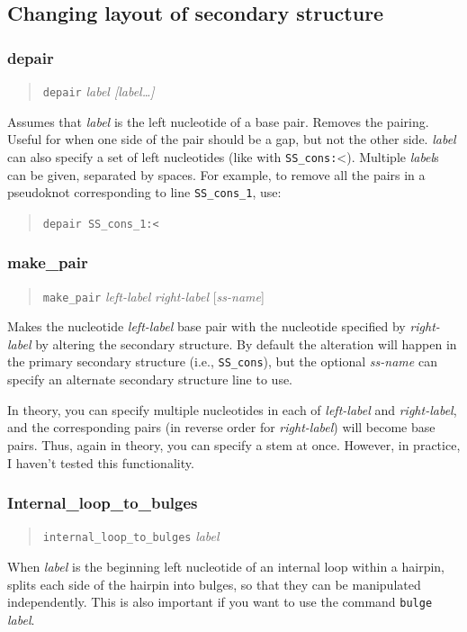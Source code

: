 \documentclass[letterpaper,12pt]{report}
\newcommand{\example}[1]{
\begin{quote}
{\raggedright
#1
}
\end{quote}
}
\newcommand{\examplett}[1]{
\example{{\tt #1}}
}
\begin{document}
\subsection{Changing layout of secondary structure}

\subsubsection{depair}
\example{{\tt depair} \textit{label [label{\dots}]}}

Assumes that \textit{label }is the left nucleotide of a base pair. 
Removes the pairing.  Useful for when one side of the pair should be a
gap, but not the other side.  \textit{label }can also specify a set of
left nucleotides (like with {\tt SS\_cons:}{\textless}). Multiple
\textit{label}s can be given, separated by spaces. For example, to
remove all the pairs in a pseudoknot corresponding to line {\tt SS\_cons\_1},
use:

\examplett{depair SS\_cons\_1:<}

\subsubsection{make\_pair}
\example{{\tt make\_pair} \textit{left-label} \textit{right-label} [\textit{ss-name}]}

Makes the nucleotide \textit{left-label} base pair with the nucleotide specified by \textit{right-label} by altering the secondary structure.  By default the alteration will happen in the primary secondary structure (i.e., {\tt SS\_cons}), but the optional \textit{ss-name} can specify an alternate secondary structure line to use.

In theory, you can specify multiple nucleotides in each of \textit{left-label} and \textit{right-label}, and the corresponding pairs (in reverse order for \textit{right-label}) will become base pairs.  Thus, again in theory, you can specify a stem at once.  However, in practice, I haven't tested this functionality.

\subsubsection[Internal\_loop\_to\_bulges]{Internal\_loop\_to\_bulges}

\example{{\tt internal\_loop\_to\_bulges} \textit{label}}

When \textit{label} is the beginning left nucleotide of an internal loop
within a hairpin, splits each side of the hairpin into bulges, so that
they can be manipulated independently.  This is also important if you
want to use the command {\tt bulge} \textit{label}.
\end{document}
